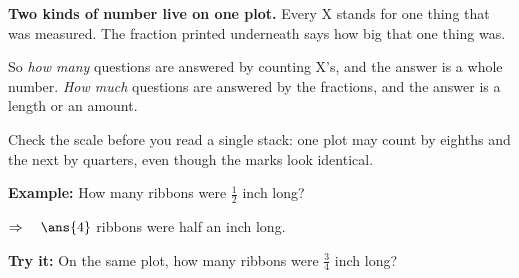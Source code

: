 \documentclass[12pt]{article}
\begin{document}


\begin{formulabox}
\textbf{Two kinds of number live on one plot.} Every \textsf{X} stands for one thing that was
measured. The fraction printed underneath says how big that one thing was.\par
\smallskip
So \emph{how many} questions are answered by counting \textsf{X}'s, and the answer is a whole
number. \emph{How much} questions are answered by the fractions, and the answer is a
length or an amount.\par
\smallskip
Check the scale before you read a single stack: one plot may count by eighths and the next by
quarters, even though the marks look identical.
\end{formulabox}

\begin{examplebox}
\textbf{Example:} \quad How many ribbons were $\frac{1}{2}$ inch long?
\begin{center}
\end{center}

$\Rightarrow\quad \ans{4}$ ribbons were half an inch long.
\end{examplebox}

\begin{tryitbox}
\textbf{Try it:} \quad On the same plot, how many ribbons were $\frac{3}{4}$ inch long?\\[2pt]
\end{tryitbox}

\end{document}
